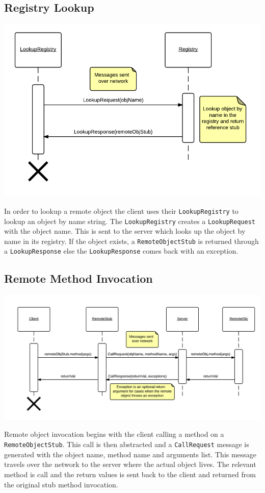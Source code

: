 \documentclass[12pt]{article}
\begin{document}
\subsection*{Registry Lookup}

\includegraphics[scale=.4]{Lookup.png}

In order to lookup a remote object the client uses their \texttt{LookupRegistry} to lookup an object by name string. The \texttt{LookupRegistry} creates a \texttt{LookupRequest} with the object name. This is sent to the server which looks up the object by name in its registry. If the object exists, a \texttt{RemoteObjectStub} is returned through a \texttt{LookupResponse} else the \texttt{LookupResponse} comes back with an exception.

\subsection*{Remote Method Invocation}

\includegraphics[scale=.3]{callMethod.png}

Remote object invocation begins with the client calling a method on a \texttt{RemoteObjectStub}. This call is then abstracted and a \texttt{CallRequest} message is generated with the object name, method name and arguments list. This message travels over the network to the server where the actual object lives. The relevant method is call and the return values is sent back to the client and returned from the original stub method invocation.
\end{document}
